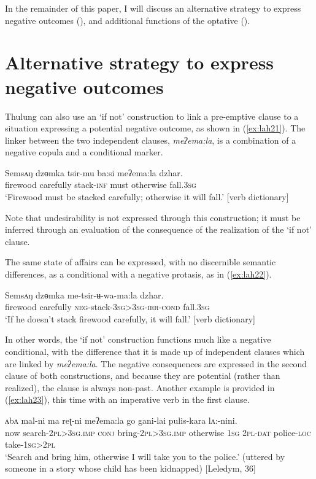 \documentclass[output=paper,colorlinks,citecolor=brown,
]{langscibook}
\begin{document}
In the remainder of this paper, I will discuss an alternative strategy to express negative outcomes (), and additional functions of the optative ().




\section{Alternative strategy to express negative outcomes}
\label{sec:altstrategy}


Thulung can also use an `if not' construction to link a pre-emptive clause to a situation expressing a potential negative outcome, as shown in (\ref{ex:lah21}). The linker between the two independent clauses, \textit{meʔema:la}, is a combination of a negative copula and a conditional marker.

\ea \label{ex:lah21}
\gll Semsʌŋ dzɵmka tsir-mu ba:si meʔema:la dzhar. \\
firewood carefully stack-\textsc{inf} must otherwise fall.\textsc{3sg} \\
\glt `Firewood must be stacked carefully; otherwise it will fall.' [verb dictionary]
\z

\noindent Note that undesirability is not expressed through this construction; it must be inferred through an evaluation of the consequence of the realization of the `if not' clause.

The same state of affairs can be expressed, with no discernible semantic differences, as a conditional with a negative protasis, as in (\ref{ex:lah22}).


\ea \label{ex:lah22}
\gll Semsʌŋ dzɵmka me-tsir-ʉ{}-wa-ma:la dzhar. \\
firewood carefully \textsc{neg-}stack-\textsc{3sg>3sg}-\textsc{irr-cond} fall\textsc{.3sg} \\
\glt `If he doesn't stack firewood carefully, it will fall.' [verb dictionary]
\z

In other words, the `if not' construction functions much like a negative conditional, with the difference that it is made up of independent clauses which are linked by \textit{meʔema:la}. The negative consequences are expressed in the second clause of both constructions, and because they are potential (rather than realized), the clause is always non-past. Another example is provided in (\ref{ex:lah23}), this time with an imperative verb in the first clause.

\ea \label{ex:lah23}
\gll ʌbʌ mal-ni ma reʈ-ni meʔema:la go gani-lai pulis-kara lʌ:-nini. \\
now search\textsc{-2pl>3sg.imp} \textsc{conj} bring-\textsc{2pl>3sg.imp} otherwise \textsc{1sg} \textsc{2pl-dat} police-\textsc{loc} take-\textsc{1sg>2pl} \\
\glt `Search and bring him, otherwise I will take you to the police.' (uttered by someone in a story whose child has been kidnapped) [Leledym, 36]
\z
\end{document}
